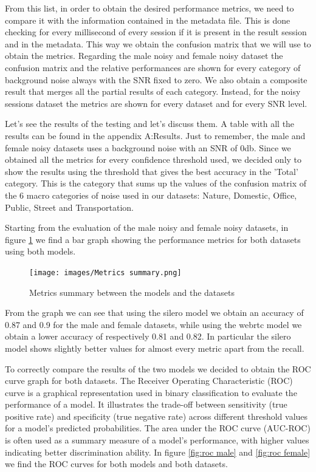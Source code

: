\documentclass[../main.tex]{subfiles}
\begin{document}
From this list, in order to obtain the desired performance metrics, we need to compare it with the information contained in the metadata file. This is done checking for every millisecond of every session if it is present in the result session and in the metadata. This way we obtain the confusion matrix that we will use to obtain the metrics. Regarding the male noisy and female noisy dataset the confusion matrix and the relative performances are shown for every category of background noise always with the SNR fixed to zero. We also obtain a composite result that merges all the partial results of each category. Instead, for the noisy sessions dataset the metrics are shown for every dataset and for every SNR level.

Let's see the results of the testing and let's discuss them. A table with all the results can be found in the appendix A:Results.
Just to remember, the male and female noisy datasets uses a background noise with an SNR of 0db. Since we obtained all the metrics for every confidence threshold used, we decided only to show the results using the threshold that gives the best accuracy in the 'Total' category. This is the category that sums up the values of the confusion matrix of the 6 macro categories of noise used in our datasets: Nature, Domestic, Office, Public, Street and Transportation. 

Starting from the evaluation of the male noisy and female noisy datasets, in figure \ref{fig:metrics summary} we find a bar graph showing the performance metrics for both datasets using both models.   

\begin{figure}[ht]
    \centering
    \texttt{[image: images/Metrics summary.png]}
    \caption{Metrics summary between the models and the datasets}
    \label{fig:metrics summary}
\end{figure}

From the graph we can see that using the silero model we obtain an accuracy of 0.87 and 0.9 for the male and female datasets, while using the webrtc model we obtain a lower accuracy of respectively 0.81 and 0.82. In particular the silero model shows slightly better values for almost every metric apart from the recall. 

To correctly compare the results of the two models we decided to obtain the ROC curve graph for both datasets. The Receiver Operating Characteristic (ROC) curve is a graphical representation used in binary classification to evaluate the performance of a model. It illustrates the trade-off between sensitivity (true positive rate) and specificity (true negative rate) across different threshold values for a model's predicted probabilities. The area under the ROC curve (AUC-ROC) is often used as a summary measure of a model's performance, with higher values indicating better discrimination ability. In figure \ref{fig:roc male} and \ref{fig:roc female} we find the ROC curves for both models and both datasets.
\end{document}
